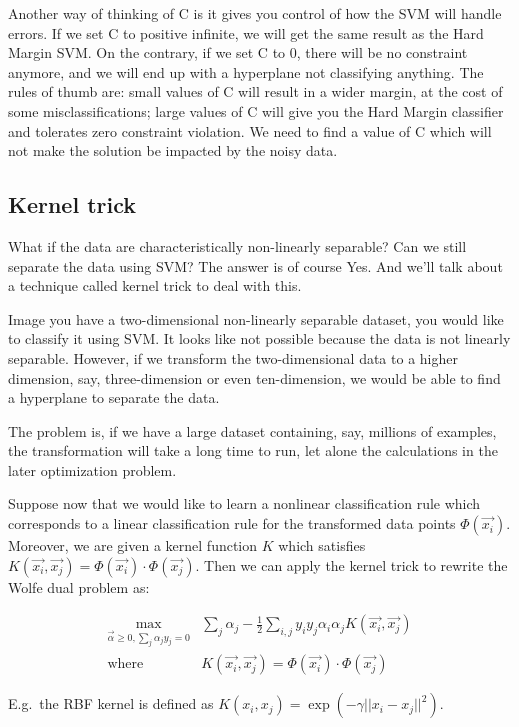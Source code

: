\documentclass{article}
\begin{document}
Another way of thinking of C is it gives you control of how the SVM will handle errors. If we set C to positive infinite, we will get the same result as the Hard Margin SVM. On the contrary, if we set C to 0, there will be no constraint anymore, and we will end up with a hyperplane not classifying anything. The rules of thumb are: small values of C will result in a wider margin, at the cost of some misclassifications; large values of C will give you the Hard Margin classifier and tolerates zero constraint violation. We need to find a value of C which will not make the solution be impacted by the noisy data.

\subsection{Kernel trick}
What if the data are characteristically non-linearly separable? Can we still separate the data using SVM? The answer is of course Yes. And we’ll talk about a technique called kernel trick to deal with this.

Image you have a two-dimensional non-linearly separable dataset, you would like to classify it using SVM. It looks like not possible because the data is not linearly separable. However, if we transform the two-dimensional data to a higher dimension, say, three-dimension or even ten-dimension, we would be able to find a hyperplane to separate the data.

The problem is, if we have a large dataset containing, say, millions of examples, the transformation will take a long time to run, let alone the calculations in the later optimization problem.


Suppose now that we would like to learn a nonlinear classification rule which corresponds to a linear classification rule for the transformed data points $\Phi (\vec{x_i})$. Moreover, we are given a kernel function $K$ which satisfies $K(\vec{x_i}, \vec{x_j}) = \Phi (\vec{x_i}) \cdot \Phi (\vec{x_j})$. Then we can apply the kernel trick to rewrite the Wolfe dual problem as:

\begin{align*}
\max_{\vec{\alpha}\geq0, \sum_j \alpha_j y_j = 0} & \sum_j \alpha_j - \frac{1}{2} \sum_{i,j} y_iy_j\alpha_i\alpha_j K(\vec{x_i}, \vec{x_j}) \\
\mathrm{where} \quad & K(\vec{x_i}, \vec{x_j}) = \Phi (\vec{x_i}) \cdot \Phi (\vec{x_j})
\end{align*}


E.g.\ the RBF kernel is defined as $K(x_i,x_j)= \exp (- \gamma || x_i - x_j ||^2)$.
\end{document}
